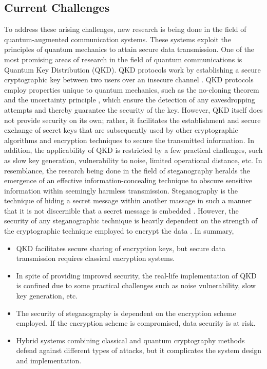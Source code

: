 \documentclass[a4paper]{cas-sc}
\begin{document}
\subsection{Current Challenges}
To address these arising challenges, new research is being done in the field of quantum-augmented communication systems. These systems exploit the principles of quantum mechanics to attain secure data transmission. One of the most promising areas of research in the field of quantum communications is Quantum Key Distribution (QKD). QKD protocols work by establishing a secure cryptographic key between two users over an insecure channel \cite{alleaume2014using}. QKD protocols employ properties unique to quantum mechanics, such as the no-cloning theorem \cite{buvzek1996quantum} and the uncertainty principle \cite{sen2014uncertainty}, which ensure the detection of any eavesdropping attempts and thereby guarantee the security of the key. However, QKD itself does not provide security on its own; rather, it facilitates the establishment and secure exchange of secret keys that are subsequently used by other cryptographic algorithms and encryption techniques to secure the transmitted information. In addition, the applicability of QKD is restricted by a few practical challenges, such as slow key generation, vulnerability to noise, limited operational distance, etc. In resemblance, the research being done in the field of steganography heralds the emergence of an effective information-concealing technique to obscure sensitive information within seemingly harmless transmission. Steganography is the technique of hiding a secret message within another massage in such a manner that it is not discernible that a secret message is embedded \cite{Kahn1996}. However, the security of any steganographic technique is heavily dependent on the strength of the cryptographic technique employed to encrypt the data \cite{anderson1998limits}. In summary,
\begin{itemize}
    \item QKD facilitates secure sharing of encryption keys, but secure data transmission requires classical encryption systems.
    \item In spite of providing improved security, the real-life implementation of QKD is confined due to some practical challenges such as noise vulnerability, slow key generation, etc.
    \item The security of steganography is dependent on the encryption scheme employed. If the encryption scheme is compromised, data security is at risk.
    \item Hybrid systems combining classical and quantum cryptography methods defend against different types of attacks, but it complicates the system design and implementation.
\end{itemize}
\end{document}
